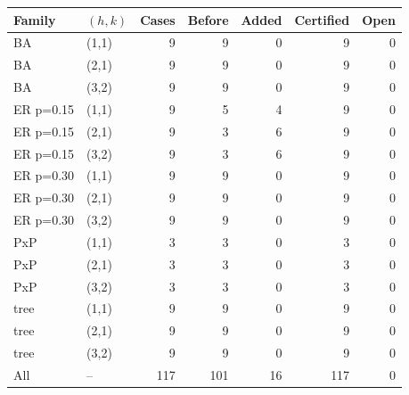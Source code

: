 \begin{tabular}{llrrrrr}
\toprule
Family & $(h,k)$ & Cases & Before & Added & Certified & Open \\
\midrule
BA & (1,1) & 9 & 9 & 0 & 9 & 0 \\
BA & (2,1) & 9 & 9 & 0 & 9 & 0 \\
BA & (3,2) & 9 & 9 & 0 & 9 & 0 \\
ER p=0.15 & (1,1) & 9 & 5 & 4 & 9 & 0 \\
ER p=0.15 & (2,1) & 9 & 3 & 6 & 9 & 0 \\
ER p=0.15 & (3,2) & 9 & 3 & 6 & 9 & 0 \\
ER p=0.30 & (1,1) & 9 & 9 & 0 & 9 & 0 \\
ER p=0.30 & (2,1) & 9 & 9 & 0 & 9 & 0 \\
ER p=0.30 & (3,2) & 9 & 9 & 0 & 9 & 0 \\
PxP & (1,1) & 3 & 3 & 0 & 3 & 0 \\
PxP & (2,1) & 3 & 3 & 0 & 3 & 0 \\
PxP & (3,2) & 3 & 3 & 0 & 3 & 0 \\
tree & (1,1) & 9 & 9 & 0 & 9 & 0 \\
tree & (2,1) & 9 & 9 & 0 & 9 & 0 \\
tree & (3,2) & 9 & 9 & 0 & 9 & 0 \\
\midrule
All & -- & 117 & 101 & 16 & 117 & 0 \\
\bottomrule
\end{tabular}
